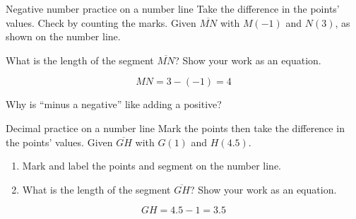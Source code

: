 \begin{frame}{Negative number practice on a number line}
  {Take the difference in the points' values. Check by counting the marks.}
  Given $\overline{MN}$ with $M(-1)$ and $N(3)$, as shown on the number line.
    \begin{center}
      \end{center} \bigskip
    What is the length of the segment $\overline{MN}$? Show your work as an equation. \par \bigskip
     $$MN=3- (-1)=4$$ \par \bigskip
    Why is ``minus a negative'' like adding a positive?
\end{frame}

\begin{frame}{Decimal practice on a number line}
  {Mark the points then take the difference in the points' values.} \vspace{1cm}
  Given $\overline{GH}$ with $G(1)$ and $H(4.5)$.
    \begin{enumerate}
      \item Mark and label the points and segment on the number line.
      \item What is the length of the segment $\overline{GH}$? Show your work as an equation.
    \end{enumerate}
    \begin{center}
    \end{center} \bigskip
     {$$GH= 4.5 - 1 = 3.5$$} \vspace{2cm}
\end{frame}

